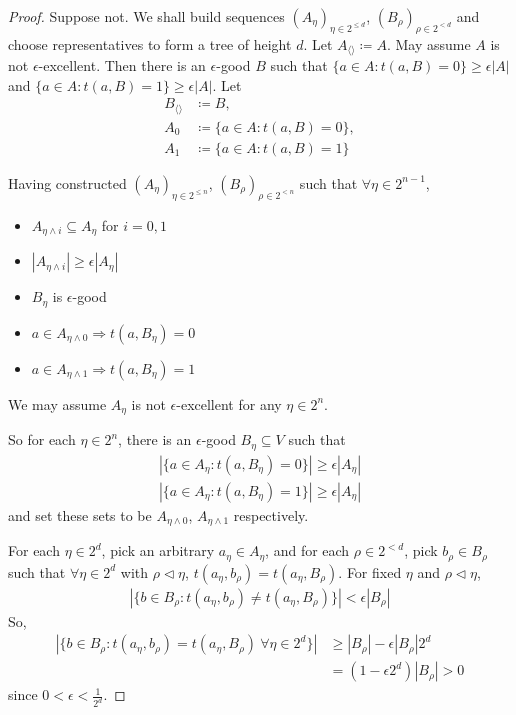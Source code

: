 \documentclass{article}
\begin{document}
\begin{proof}
  Suppose not. We shall build sequences $(A_\eta)_{\eta \in 2^{\leq d}}$, $(B_\rho)_{\rho \in 2^{<d}}$ and choose representatives to form a tree of height $d$.
  Let $A_{\langle\rangle} \coloneqq A$. May assume $A$ is not $\epsilon$-excellent.
  Then there is an $\epsilon$-good $B$ such that $\{a \in A : t(a,B) = 0\} \geq \epsilon |A|$ and $\{a \in A : t(a,B) = 1\} \geq \epsilon |A|$.
  Let
  \begin{align*}
    B_{\langle\rangle} &\coloneqq B, \\
    A_0 &\coloneqq \{a \in A : t(a,B) = 0\}, \\
    A_1 &\coloneqq \{a \in A : t(a,B) = 1\}
  \end{align*}

  Having constructed $(A_\eta)_{\eta \in 2^{\leq n}}$, $(B_\rho)_{\rho \in 2^{<n}}$ such that $\forall \eta \in 2^{n-1}$,
  \begin{itemize}
    \item $A_{\eta \wedge i} \subseteq A_\eta$ for $i = 0,1$
    \item $|A_{\eta \wedge i}| \geq \epsilon |A_{\eta}|$
    \item $B_\eta$ is $\epsilon$-good
    \item $a \in A_{\eta \wedge 0} \Rightarrow t(a,B_\eta) = 0$
    \item $a \in A_{\eta \wedge 1} \Rightarrow t(a,B_\eta) = 1$
  \end{itemize}
  We may assume $A_\eta$ is not $\epsilon$-excellent for any $\eta \in 2^n$.

  So for each $\eta \in 2^n$, there is an $\epsilon$-good $B_\eta \subseteq V$ such that
  \begin{align*}
    |\{a \in A_\eta : t(a, B_\eta) = 0\}| \geq \epsilon |A_\eta| \\
    |\{a \in A_\eta : t(a, B_\eta) = 1\}| \geq \epsilon |A_\eta|
  \end{align*}
  and set these sets to be $A_{\eta \wedge 0}$, $A_{\eta \wedge 1}$ respectively.

  For each $\eta \in 2^d$, pick an arbitrary $a_{\eta} \in A_{\eta}$, and for each $\rho \in 2^{<d}$, pick $b_\rho \in B_\rho$ such that $\forall \eta \in 2^d$ with $\rho \lhd \eta$, $t(a_\eta, b_\rho) = t(a_\eta, B_\rho)$.
  For fixed $\eta$ and $\rho \lhd \eta$,
  \begin{align*}
    |\{b \in B_\rho : t(a_\eta, b_\rho) \neq t(a_\eta, B_\rho)\}| < \epsilon |B_\rho|
  \end{align*}
  So,
  \begin{align*}
    |\{b \in B_\rho : t(a_\eta, b_\rho) = t(a_\eta, B_\rho) \ \forall \eta \in 2^d\}| &\geq |B_\rho| - \epsilon |B_\rho| 2^d \\
                                                                                      &= (1-\epsilon 2^d) |B_\rho| > 0
  \end{align*}
  since $0 < \epsilon < \frac{1}{2^d}$.
\end{proof}
\end{document}
